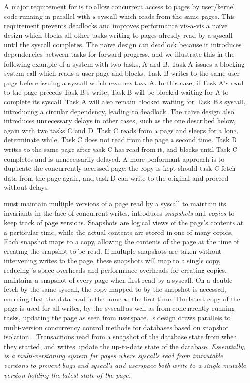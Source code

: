 \documentclass[letterpaper,twocolumn,10pt, anonymous]{article}
\begin{document}
A major requirement for \tiktok is to allow concurrent access to pages
by user/kernel code running in parallel with a syscall which reads from 
the same pages.
This requirement prevents deadlocks and improves performance vis-a-vis
a na\"ive design which blocks all other tasks writing to pages already 
read by a syscall until the syscall completes.
The na\"ive design can deadlock because it introduces dependencies between
tasks for forward progress, and we illustrate this in the following example
of a system with two tasks, A and B.
Task A issues a blocking system call which reads a user page and blocks. 
Task B writes to the same user page before issuing a syscall which 
resumes task A. 
In this case, if Task A's read to the page preceds Task B's write, 
Task B will be blocked waiting for A to complete its syscall.
Task A will also remain blocked waiting for Task B's syscall, 
introducing a circular dependency, leading to deadlock.
The na\"ive design also introduces unnecessary delays in other cases, 
such as the one described below, again with two tasks C and D.
Task C reads from a page and sleeps for a long, determinate while.
Task C does not read from the page a second time.
Task D writes to the same page after task C has read from it, and 
blocks until Task C completes and is unnecessarily delayed.
A more performant approach is to duplicate the concurrently accessed page: the copy is 
kept should task C fetch data from the page again, and task D
can write to the original and proceed without delays.

\tiktok must maintain multiple versions of a page read by a syscall 
to maintain its invariants in the face of concurrent writes.
\tiktok introduces \emph{snapshots} and \emph{copies} to keep track 
of page versions. 
Snapshots are logical views of the page's contents at a particular time,
while the actual contents are stored in one of many copies. 
Each snapshot maps to a copy, allowing the contents of the page at the 
time of creating the snapshot to be read. 
If multiple snapshots are taken without intervening writes to the page, 
these snapshots will map to a single copy, reducing \tiktok's space overheads 
and performance overheads for creating copies.
\tiktok maintains a snapshot of every page when first read by a syscall.
On a double fetch by the same syscall, the copy mapped to by the snapshot 
is accessed, ensuring that the data read is the same as the first time.
The latest copy of the page is used for all writes, by the syscall as 
well as from concurrently running tasks, updating the page as seen 
from userspace.
%
\tiktok's design draws parallels to multi-version concurrency control 
methods for databases based on snapshot isolation~\cite{0001MK15}.
Transactions read from a snapshot of the database state from when 
they started, and writes update the up-to-date state of the database.
%
\emph{Essentially, \tiktok is a multi-versioning system for pages where 
syscalls read from immutable versions to prevent \tocttou bugs and
syscalls and userspace both write to a single mutable version 
holding the latest state of the page.}
\end{document}
